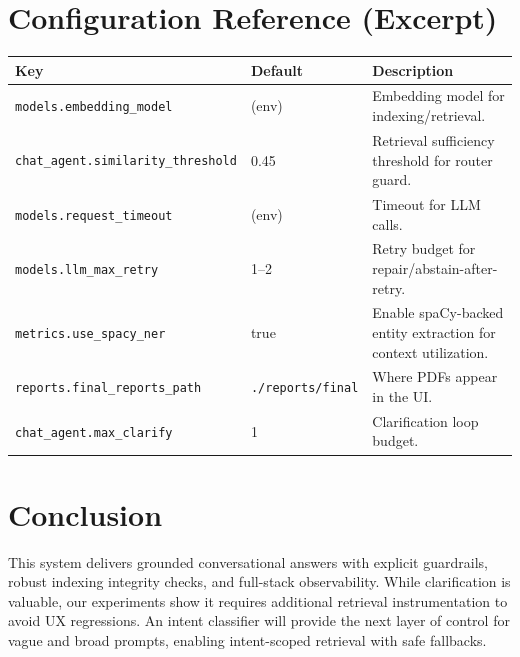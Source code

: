 \documentclass[11pt]{article}
\begin{document}
\section{Configuration Reference (Excerpt)}
\begin{table}[h]
\centering
\small
\begin{tabularx}{\textwidth}{@{}l l Y@{}}
\toprule
\textbf{Key} & \textbf{Default} & \textbf{Description} \\
\midrule
\texttt{models.embedding\_model} & (env) & Embedding model for indexing/retrieval. \\
\texttt{chat\_agent.similarity\_threshold} & 0.45 & Retrieval sufficiency threshold for router guard. \\
\texttt{models.request\_timeout} & (env) & Timeout for LLM calls. \\
\texttt{models.llm\_max\_retry} & 1--2 & Retry budget for repair/abstain-after-retry. \\
\texttt{metrics.use\_spacy\_ner} & true & Enable spaCy-backed entity extraction for context utilization. \\
\texttt{reports.final\_reports\_path} & \texttt{./reports/final} & Where PDFs appear in the UI. \\
\texttt{chat\_agent.max\_clarify} & 1 & Clarification loop budget. \\
\bottomrule
\end{tabularx}
\end{table}

\section{Conclusion}
This system delivers grounded conversational answers with explicit guardrails, robust indexing integrity checks, and full-stack observability. While clarification is valuable, our experiments show it requires additional retrieval instrumentation to avoid UX regressions. An intent classifier will provide the next layer of control for vague and broad prompts, enabling intent-scoped retrieval with safe fallbacks.
\end{document}
